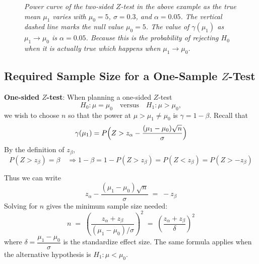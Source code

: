 \documentclass[twoside]{book}
\begin{document}
\begin{figure}[H]
\caption{\textit{Power curve of the two-sided $Z$-test in the above example as the true mean $\mu_1$ varies  with \(\mu_0=5\), \(\sigma=0.3\), and \(\alpha=0.05\). The vertical dashed line marks the null value $\mu_0=5$. The value of $\gamma(\mu_1)$ as $\mu_1 \to \mu_0$ is $\alpha =0.05$. Because this is the probability of rejecting $H_0$ when it is actually true which happens when $\mu_1 \to \mu_0$.}}
\end{figure}



\subsection{Required Sample Size for a One-Sample $Z$-Test}

\textbf{One-sided $Z$-test}: When planning a one-sided $Z$-test
\[
H_0: \mu = \mu_0
\quad\text{versus}\quad
H_1: \mu > \mu_0,
\]
we wish to choose \(n\) so that the power at \(\mu>\mu_1 \neq \mu_0\) is
\(\gamma = 1-\beta\).  Recall that
\[
\gamma(\mu_1)
= P\Bigl(Z > z_\alpha - \dfrac{(\mu_1-\mu_0)\sqrt{n}}{\sigma}\Bigr)
\]
By the definition of \(z_\beta\),
$$P(Z>z_\beta)=\beta \quad \Longrightarrow 1-\beta = 1-P(Z>z_\beta)=P(Z<z_\beta)=P(Z>-z_\beta)$$

Thus we can write
\[
z_\alpha - \frac{(\mu_1-\mu_0)\sqrt{n}}{\sigma} \;=\; -z_\beta
\]
Solving for \(n\) gives the minimum sample size needed:
\[
n \;=\;
\left(\frac{z_\alpha + z_\beta}{(\mu_1 - \mu_0)/\sigma}\right)^{\!2}
\;=\;
\left(\frac{z_\alpha + z_\beta}{\delta}\right)^2
\]
where $\delta = \dfrac{\mu_1-\mu_0}{\sigma}$ is the standardize effect size. The same formula applies when the alternative hypothesis is \(H_1: \mu < \mu_0\).
\end{document}
